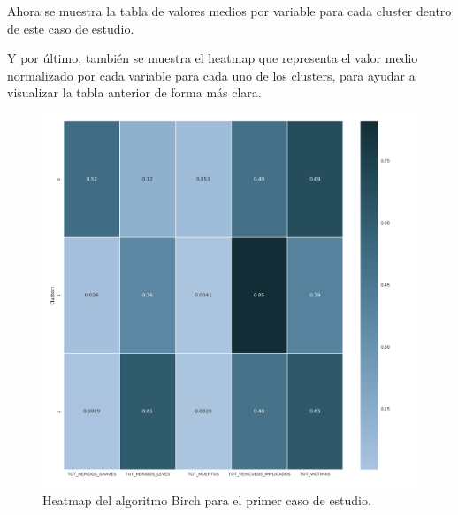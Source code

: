	Ahora se muestra la tabla de valores medios por variable para cada cluster dentro de este caso de estudio.
	
	\begin{table}[H]
		\centering
		\caption{Tabla de valores medios del algoritmo Birch para el primer caso de estudio.}
	\end{table}

	Y por último, también se muestra el heatmap que representa el valor medio normalizado por cada variable para cada uno de los clusters, para ayudar a visualizar la tabla anterior de forma más clara.

	\begin{figure}[H]
		\centering
		\includegraphics[scale=0.4]{heatmaps/Birch-HighwayAccidents-Heatmap.png}
		\caption{Heatmap del algoritmo Birch para el primer caso de estudio.}
	\end{figure}

